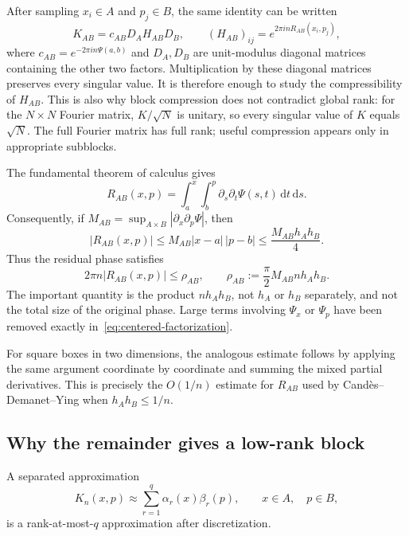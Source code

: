 \documentclass[11pt,a4paper]{article}
\begin{document}
After sampling $x_i\in A$ and $p_j\in B$, the same identity can be written
\begin{equation}
    K_{AB}=c_{AB}D_AH_{AB}D_B,
    \qquad (H_{AB})_{ij}=e^{2\pi i nR_{AB}(x_i,p_j)},
\end{equation}
where $c_{AB}=e^{-2\pi i n\Psi(a,b)}$ and $D_A,D_B$ are unit-modulus diagonal matrices containing the other two factors. Multiplication by these diagonal matrices preserves every singular value. It is therefore enough to study the compressibility of $H_{AB}$. This is also why block compression does not contradict global rank: for the $N\times N$ Fourier matrix, $K/\sqrt{N}$ is unitary, so every singular value of $K$ equals $\sqrt{N}$. The full Fourier matrix has full rank; useful compression appears only in appropriate subblocks.

The fundamental theorem of calculus gives
\begin{equation}
    R_{AB}(x,p)
    =\int_a^x\int_b^p \partial_s\partial_t\Psi(s,t)
      \,\mathrm{d}t\,\mathrm{d}s.
    \label{eq:mixed-integral}
\end{equation}
Consequently, if
$M_{AB}=\sup_{A\times B}|\partial_x\partial_p\Psi|$, then
\begin{equation}
    |R_{AB}(x,p)|
    \leq M_{AB}|x-a|\,|p-b|
    \leq \frac{M_{AB}h_Ah_B}{4}.
    \label{eq:rectangle-bound}
\end{equation}
Thus the residual phase satisfies
\begin{equation}
    2\pi n|R_{AB}(x,p)|
    \leq \rho_{AB},
    \qquad
    \rho_{AB}:=\frac{\pi}{2}M_{AB}n h_Ah_B.
    \label{eq:residual-phase-bound}
\end{equation}
The important quantity is the product $n h_Ah_B$, not $h_A$ or $h_B$ separately, and not the total size of the original phase. Large terms involving $\Psi_x$ or $\Psi_p$ have been removed exactly in~\eqref{eq:centered-factorization}.

For square boxes in two dimensions, the analogous estimate follows by applying the same argument coordinate by coordinate and summing the mixed partial derivatives. This is precisely the $O(1/n)$ estimate for $R_{AB}$ used by Cand\`{e}s--Demanet--Ying when $h_Ah_B\leq 1/n$.

\subsection{Why the remainder gives a low-rank block}

A separated approximation
\begin{equation}
    K_n(x,p)\approx \sum_{r=1}^{q}\alpha_r(x)\beta_r(p),
    \qquad x\in A,\quad p\in B,
    \label{eq:separated-block}
\end{equation}
is a rank-at-most-$q$ approximation after discretization.
\end{document}
